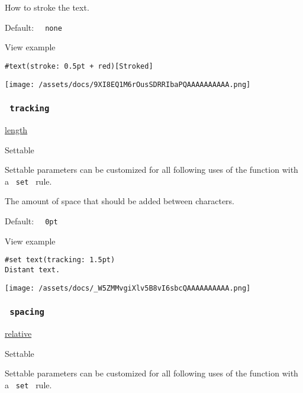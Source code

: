 How to stroke the text.

Default: \texttt{\ }{\texttt{\ none\ }}\texttt{\ }


View example

\begin{verbatim}
#text(stroke: 0.5pt + red)[Stroked]
\end{verbatim}

\texttt{[image: /assets/docs/9XI8EQ1M6rOusSDRRIbaPQAAAAAAAAAA.png]}

\subsubsection{\texorpdfstring{\texttt{\ tracking\ }}{ tracking }}\label{parameters-tracking}

\href{/docs/reference/layout/length/}{length}

{{ Settable }}

\label{parameters-tracking-settable-tooltip}
Settable parameters can be customized for all following uses of the
function with a \texttt{\ set\ } rule.

The amount of space that should be added between characters.

Default: \texttt{\ }{\texttt{\ 0pt\ }}\texttt{\ }


View example

\begin{verbatim}
#set text(tracking: 1.5pt)
Distant text.
\end{verbatim}

\texttt{[image: /assets/docs/\_W5ZMMvgiXlv5B8vI6sbcQAAAAAAAAAA.png]}

\subsubsection{\texorpdfstring{\texttt{\ spacing\ }}{ spacing }}\label{parameters-spacing}

\href{/docs/reference/layout/relative/}{relative}

{{ Settable }}

\label{parameters-spacing-settable-tooltip}
Settable parameters can be customized for all following uses of the
function with a \texttt{\ set\ } rule.

